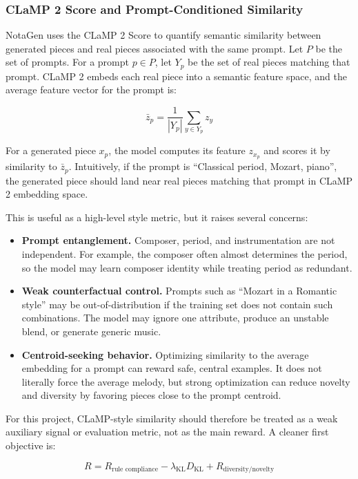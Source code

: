 \documentclass[11pt]{article}
\begin{document}
\subsubsection{CLaMP 2 Score and Prompt-Conditioned Similarity}

NotaGen uses the CLaMP 2 Score to quantify semantic similarity between generated
pieces and real pieces associated with the same prompt. Let \(P\) be the set of
prompts. For a prompt \(p \in P\), let \(Y_p\) be the set of real pieces matching
that prompt. CLaMP 2 embeds each real piece into a semantic feature space, and
the average feature vector for the prompt is:

\[
\bar{z}_p = \frac{1}{|Y_p|}\sum_{y \in Y_p} z_y
\]

For a generated piece \(x_p\), the model computes its feature \(z_{x_p}\) and
scores it by similarity to \(\bar{z}_p\). Intuitively, if the prompt is
``Classical period, Mozart, piano'', the generated piece should land near real
pieces matching that prompt in CLaMP 2 embedding space.

This is useful as a high-level style metric, but it raises several concerns:

\begin{itemize}[leftmargin=*]
  \item \textbf{Prompt entanglement.} Composer, period, and instrumentation are
  not independent. For example, the composer often almost determines the period,
  so the model may learn composer identity while treating period as redundant.
  \item \textbf{Weak counterfactual control.} Prompts such as ``Mozart in a
  Romantic style'' may be out-of-distribution if the training set does not
  contain such combinations. The model may ignore one attribute, produce an
  unstable blend, or generate generic music.
  \item \textbf{Centroid-seeking behavior.} Optimizing similarity to the average
  embedding for a prompt can reward safe, central examples. It does not literally
  force the average melody, but strong optimization can reduce novelty and
  diversity by favoring pieces close to the prompt centroid.
\end{itemize}

For this project, CLaMP-style similarity should therefore be treated as a weak
auxiliary signal or evaluation metric, not as the main reward. A cleaner first
objective is:

\[
R = R_{\text{rule compliance}} - \lambda_{\text{KL}}D_{\text{KL}}
  + R_{\text{diversity/novelty}}
\]
\end{document}
